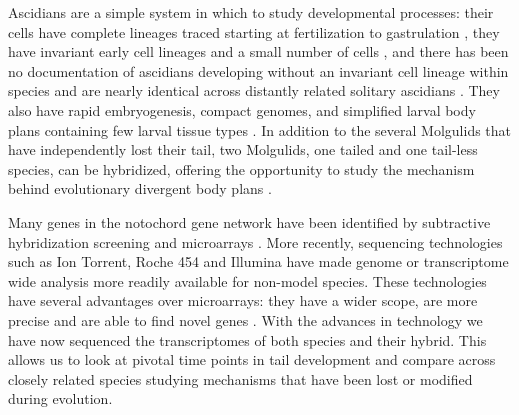 Ascidians are a simple system in which to study developmental processes: their cells have complete lineages traced starting at fertilization \cite{nishida_cell_1983} to gastrulation \cite{nishida_cell_1985,nishida_cell_1987}, they have invariant early cell lineages and a small number of cells \cite{lemaire_evolutionary_2011}, and there has been no documentation of ascidians developing without an invariant cell lineage within species and are nearly identical across distantly related solitary ascidians \cite{lemaire_ascidians_2008,nishida_cell_2014}. They also have rapid embryogenesis, compact genomes, and simplified larval body plans containing few larval tissue types \cite{corbo_characterization_1997,jeffery_minireview_2002,dehal_draft_2002}.  %
In addition to the several Molgulids that have independently lost their tail, two Molgulids, one tailed and one tail-less species, can be hybridized, offering the opportunity to study the mechanism behind evolutionary divergent body plans \cite{jeffery_evolutionary_1991}. %

Many genes in the notochord gene network have been identified by subtractive hybridization screening and microarrays \cite{jeffery_factors_1992,hotta_characterization_2000,gyoja_analysis_2007,kobayashi_differential_2013}. More recently, sequencing technologies such as Ion Torrent, Roche 454 and Illumina have made genome or transcriptome wide analysis more readily available for non-model species. These technologies have several advantages over microarrays: they have a wider scope, are more precise and are able to find novel genes \cite{marioni_rna-seq:_2008}. With the advances in technology we have now sequenced the transcriptomes of both species and their hybrid. This allows us to look at pivotal time points in tail development and compare across closely related species studying mechanisms that have been lost or modified during evolution. 

